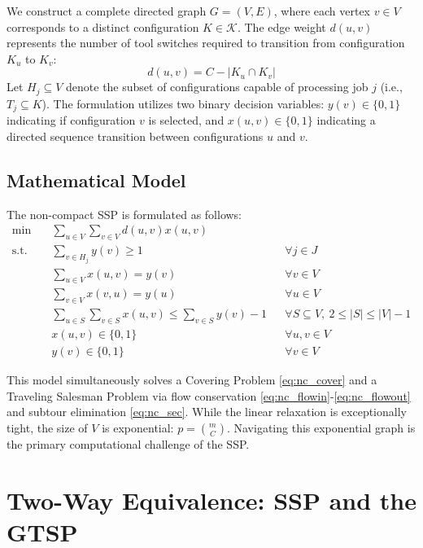 \documentclass[12pt]{article}
\begin{document}
	We construct a complete directed graph $G = (V, E)$, where each vertex $v \in V$ corresponds to a distinct configuration $K \in \mathcal{K}$. The edge weight $d(u,v)$ represents the number of tool switches required to transition from configuration $K_u$ to $K_v$:
	\begin{equation}
		d(u,v) = C - |K_u \cap K_v|
	\end{equation}
	Let $H_j \subseteq V$ denote the subset of configurations capable of processing job $j$ (i.e., $T_j \subseteq K$). The formulation utilizes two binary decision variables: $y(v) \in \{0, 1\}$ indicating if configuration $v$ is selected, and $x(u,v) \in \{0, 1\}$ indicating a directed sequence transition between configurations $u$ and $v$.
	
	\subsection{Mathematical Model}
	The non-compact SSP is formulated as follows:
	\begin{align}
		\min \quad & \sum_{u \in V} \sum_{v \in V} d(u,v) x(u,v) \label{eq:nc_obj} \\
		\text{s.t.} \quad & \sum_{v \in H_j} y(v) \ge 1 && \forall j \in J \label{eq:nc_cover} \\
		& \sum_{u \in V} x(u,v) = y(v) && \forall v \in V \label{eq:nc_flowin} \\
		& \sum_{v \in V} x(v,u) = y(u) && \forall u \in V \label{eq:nc_flowout} \\
		& \sum_{u \in S} \sum_{v \in S} x(u,v) \le \sum_{v \in S} y(v) - 1 && \forall S \subseteq V, \ 2 \le |S| \le |V| - 1 \label{eq:nc_sec} \\
		& x(u,v) \in \{0, 1\} && \forall u,v \in V \label{eq:nc_varx} \\
		& y(v) \in \{0, 1\} && \forall v \in V \label{eq:nc_vary}
	\end{align}
	
	This model simultaneously solves a Covering Problem \eqref{eq:nc_cover} and a Traveling Salesman Problem via flow conservation \eqref{eq:nc_flowin}-\eqref{eq:nc_flowout} and subtour elimination \eqref{eq:nc_sec}. While the linear relaxation is exceptionally tight, the size of $V$ is exponential: $p = \binom{m}{C}$. Navigating this exponential graph is the primary computational challenge of the SSP.


\section{Two-Way Equivalence: SSP and the GTSP}
\end{document}
